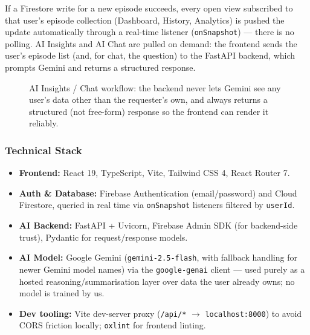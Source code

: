 \documentclass[11pt,a4paper]{article}
\begin{document}
If a Firestore write for a new episode succeeds, every open view subscribed to that user's
episode collection (Dashboard, History, Analytics) is pushed the update automatically through a
real-time listener (\texttt{onSnapshot}) — there is no polling. AI Insights and AI Chat are
pulled on demand: the frontend sends the user's episode list (and, for chat, the question) to
the FastAPI backend, which prompts Gemini and returns a structured response.

\begin{figure}[h!]
\centering
{}
\caption{AI Insights / Chat workflow: the backend never lets Gemini see any user's data other
than the requester's own, and always returns a structured (not free-form) response so the
frontend can render it reliably.}
\end{figure}

\subsubsection{Technical Stack}
\begin{itemize}
    \item \textbf{Frontend:} React 19, TypeScript, Vite, Tailwind CSS 4, React Router 7.
    \item \textbf{Auth \& Database:} Firebase Authentication (email/password) and Cloud
    Firestore, queried in real time via \texttt{onSnapshot} listeners filtered by \texttt{userId}.
    \item \textbf{AI Backend:} FastAPI + Uvicorn, Firebase Admin SDK (for backend-side trust),
    Pydantic for request/response models.
    \item \textbf{AI Model:} Google Gemini (\texttt{gemini-2.5-flash}, with fallback handling
    for newer Gemini model names) via the \texttt{google-genai} client — used purely as a hosted
    reasoning/summarisation layer over data the user already owns; no model is trained by us.
    \item \textbf{Dev tooling:} Vite dev-server proxy (\texttt{/api/*} $\to$
    \texttt{localhost:8000}) to avoid CORS friction locally; \texttt{oxlint} for frontend
    linting.
\end{itemize}
\end{document}
